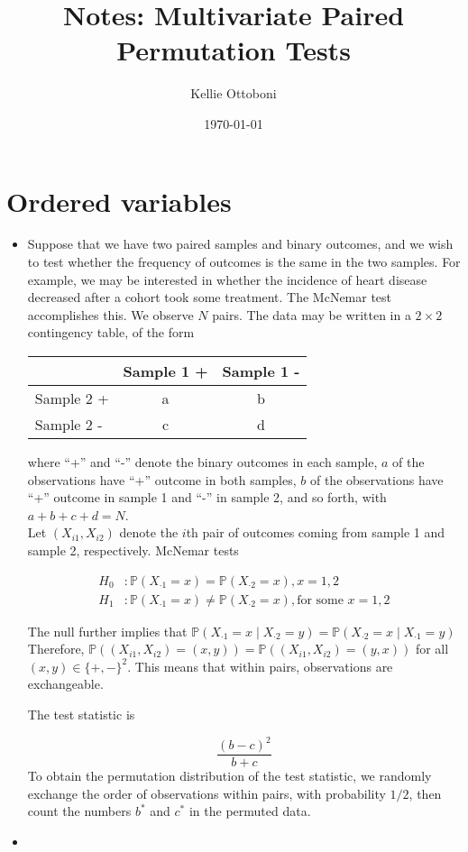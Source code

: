 \documentclass[12pt]{article}
\title{Notes: Multivariate Paired Permutation Tests}
\author{Kellie Ottoboni}
\date{\today}
\newcommand{\pr}{\mathbb{P}} %
\begin{document}
\maketitle







\section{Ordered variables}
\begin{itemize}
\item Suppose that we have two paired samples and binary outcomes, and we wish to test whether the frequency of outcomes is the same in the two samples.
For example, we may be interested in whether the incidence of heart disease decreased after a cohort took some treatment.
The McNemar test accomplishes this.
We observe $N$ pairs.
The data may be written in a $2 \times 2$ contingency table, of the form

\begin{table}[h]
\begin{tabular}{|l|c|c|}
\hline
 & Sample 1 + & Sample 1 - \\
 \hline
 Sample 2 + & a & b \\
 \hline 
 Sample 2 - & c & d \\
 \hline
\end{tabular}
\end{table}
where ``+'' and ``-'' denote the binary outcomes in each sample,
$a$ of the observations have ``+'' outcome in both samples,
$b$ of the observations have ``+'' outcome in sample 1 and ``-'' in sample 2, and so forth,
with $a + b + c + d = N$. \\

Let $(X_{i1}, X_{i2})$ denote the $i$th pair of outcomes coming from sample 1 and sample 2, respectively.
McNemar tests

\begin{align*}
H_0&: \pr(X_{\cdot 1} = x) =  \pr(X_{\cdot 2} = x), x = 1, 2 \\
H_1&: \pr(X_{\cdot 1}  = x) \neq  \pr(X_{\cdot 2}  = x), \text{for some } x = 1, 2 
\end{align*}

The null further implies that $\pr(X_{\cdot 1} = x \mid X_{\cdot 2} = y) = \pr(X_{\cdot 2} = x \mid X_{\cdot 1} = y)$
Therefore, $\pr((X_{i1}, X_{i2}) = (x, y)) = \pr((X_{i1}, X_{i2}) = (y, x))$ for all $(x, y) \in \{ +, - \}^2$.
This means that within pairs, observations are exchangeable.


The test statistic is

$$\frac{(b-c)^2}{b+c}$$
To obtain the permutation distribution of the test statistic, we randomly exchange the order of observations within pairs, with probability $1/2$, then count the numbers $b^*$ and $c^*$ in the permuted data.
\item 
\end{itemize}
\end{document}
